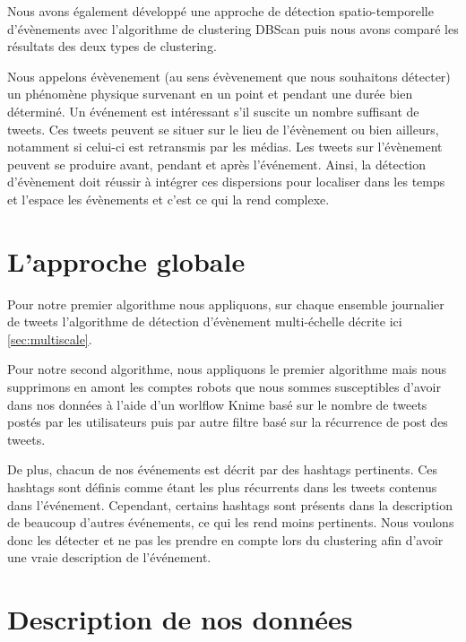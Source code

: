 \documentclass[12pt]{article}
\begin{document}
Nous avons \'egalement d\'evelopp\'e une approche de d\'etection spatio-temporelle d'\'ev\`enements avec l'algorithme de clustering DBScan puis nous avons compar\'e les r\'esultats des deux types de clustering.

Nous appelons \'ev\`evenement (au sens \'ev\`evenement que nous souhaitons d\'etecter) un ph\'enom\`ene physique survenant en un point et pendant une dur\'ee bien d\'etermin\'e. Un \'ev\'enement est int\'eressant s'il suscite un nombre suffisant de tweets. Ces tweets peuvent se situer sur le lieu de l'\'ev\`enement ou bien ailleurs, notamment si celui-ci est retransmis par les m\'edias. Les tweets sur l'\'ev\`enement peuvent se produire avant, pendant et apr\`es l'\'ev\'enement. Ainsi, la d\'etection d'\'ev\`enement doit r\'eussir \`a int\'egrer ces dispersions pour localiser dans les temps et l'espace les \'ev\`enements et c'est ce qui la rend complexe.

\newpage

\section{L'approche globale}

Pour notre premier algorithme nous appliquons, sur chaque ensemble journalier de tweets l'algorithme de d\'etection d'\'ev\`enement multi-\'echelle décrite ici \autoref{sec:multiscale}.

Pour notre second algorithme, nous appliquons le premier algorithme mais nous supprimons en amont les comptes robots
que nous sommes susceptibles d'avoir dans nos donn\'ees \`a l'aide d'un worlflow Knime bas\'e sur le nombre de tweets post\'es par les utilisateurs puis par autre filtre bas\'e sur la r\'ecurrence de post des tweets. 

De plus, chacun de nos \'ev\'enements est d\'ecrit par des hashtags pertinents. Ces hashtags sont d\'efinis comme \'etant les plus r\'ecurrents dans les tweets contenus dans l'\'ev\'enement. Cependant, certains hashtags sont pr\'esents dans la description de
beaucoup d'autres \'ev\'enements, ce qui les rend moins pertinents. Nous voulons donc les d\'etecter et ne pas les prendre en compte lors du clustering afin d'avoir une vraie description de l'\'ev\'enement.


\section{Description de nos donn\'ees}
\label{sec:desc_donnees}
\end{document}
